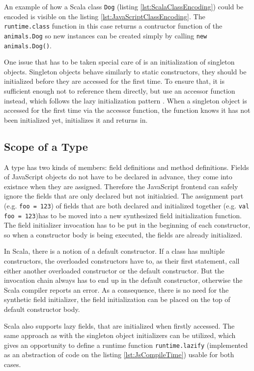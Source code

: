 \documentclass[12pt,a4paper]{report}
\begin{document}
An example of how a Scala class \texttt{Dog} (listing \ref{lst:ScalaClassEncoding}) could be encoded is visible on the listing \ref{lst:JavaScriptClassEncoding}. The \texttt{runtime.class} function in this case returns a contructor function of the \texttt{animals.Dog} so new instances can be created simply by calling \texttt{new animals.Dog()}.

One issue that has to be taken special care of is an initialization of singleton objects. Singleton objects behave similarly to static constructors, they should be initialized before they are accessed for the first time. To ensure that, it is sufficient enough not to reference them directly, but use an accessor function instead, which follows the lazy initialization pattern \cite{Lazy}. When a singleton object is accessed for the first time via the accessor function, the function knows it has not been initialized yet, initializes it and returns in.

\subsection{Scope of a Type}

A type has two kinds of members: field definitions and method definitions. Fields of JavaScript objects do not have to be declared in advance, they come into existnce when they are assigned. Therefore the JavaScript frontend can safely ignore the fields that are only declared but not initialzied. The assignment part (e.g. \texttt{foo = 123}) of fields that are both declared and initialized together (e.g. \texttt{val foo = 123})has to be moved into a new synthesized field initialization function. The field initializer invocation has to be put in the beginning of each constructor, so when a constructor body is being executed, the fields are already initialized.

In Scala, there is a notion of a default constructor. If a class has multiple constructors, the overloaded constructors have to, as their first statement, call either another overloaded constructor or the default constructor. But the invocation chain always has to end up in the default constructor, otherwise the Scala compiler reports an error. As a consequence, there is no need for the synthetic field initializer, the field initialization can be placed on the top of default constructor body.

Scala also supports lazy fields, that are initialized when firstly accessed. The same approach as with the singleton object initializers can be utilized, which gives an opportunity to define a runtime function \texttt{runtime.lazify} (implemented as an abstraction of code on the listing \ref{lst:JsCompileTime}) usable for both cases.
\end{document}
